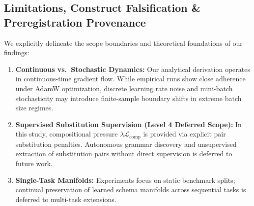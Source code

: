 \documentclass{article}
\theoremstyle{plain}
\theoremstyle{definition}
\begin{document}
\subsection{Limitations, Construct Falsification \& Preregistration Provenance}
\label{sec:limitations_falsification}
We explicitly delineate the scope boundaries and theoretical foundations of our findings:
\begin{enumerate}[leftmargin=*,noitemsep]
    \item \textbf{Continuous vs.\ Stochastic Dynamics:} Our analytical derivation operates in continuous-time gradient flow. While empirical runs show close adherence under AdamW optimization, discrete learning rate noise and mini-batch stochasticity may introduce finite-sample boundary shifts in extreme batch size regimes.
    \item \textbf{Supervised Substitution Supervision (Level 4 Deferred Scope):} In this study, compositional pressure $\lambda \mathcal{L}_{\text{comp}}$ is provided via explicit pair substitution penalties. Autonomous grammar discovery and unsupervised extraction of substitution pairs without direct supervision is deferred to future work.
    \item \textbf{Single-Task Manifolds:} Experiments focus on static benchmark splits; continual preservation of learned schema manifolds across sequential tasks is deferred to multi-task extensions.
\end{enumerate}
\end{document}
